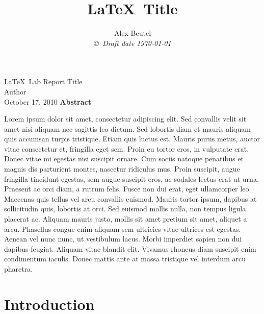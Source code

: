 \documentclass[12pt]{report}
\title{\LaTeX \ Title }
\author{Alex Beutel  \\
{\small\em \copyright \  Draft date \today }}
\date{ }
\begin{document}

\begin{titlepage}
	\begin{center}
		{\LARGE \LaTeX~Lab Report Title}\\[1.5cm]
		{\large Author\\ October 17, 2010}
		\vfill
		{\bf Abstract}\\[1cm]
\begin{minipage}{0.85\textwidth}
Lorem ipsum dolor sit amet, consectetur adipiscing elit. Sed convallis velit sit amet nisi aliquam nec sagittis leo dictum. Sed lobortis diam et mauris aliquam quis accumsan turpis tristique. Etiam quis luctus est. Mauris purus metus, auctor vitae consectetur et, fringilla eget sem. Proin eu tortor eros, in vulputate erat. Donec vitae mi egestas nisi suscipit ornare. Cum sociis natoque penatibus et magnis dis parturient montes, nascetur ridiculus mus. Proin suscipit, augue fringilla tincidunt egestas, sem augue suscipit eros, ac sodales lectus erat ut urna. Praesent ac orci diam, a rutrum felis. Fusce non dui erat, eget ullamcorper leo. Maecenas quis tellus vel arcu convallis euismod. Mauris tortor ipsum, dapibus at sollicitudin quis, lobortis at orci. Sed euismod mollis nulla, non tempus ligula placerat ac. Aliquam mauris justo, mollis sit amet pretium sit amet, aliquet a arcu. Phasellus congue enim aliquam sem ultricies vitae ultrices est egestas. Aenean vel nunc nunc, ut vestibulum lacus. Morbi imperdiet sapien non dui dapibus feugiat. Aliquam vitae blandit elit. Vivamus rhoncus diam suscipit enim condimentum iaculis. Donec mattis ante at massa tristique vel interdum arcu pharetra.
\end{minipage}

	\end{center}
\end{titlepage}


\tableofcontents
\listoffigures
\listoftables

\pagestyle{headings}

\pagestyle{plain}

\chapter{Introduction}
\end{document}
